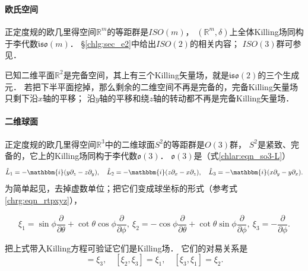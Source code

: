 \paragraph{欧氏空间}
正定度规的欧几里得空间$\mathbb{R}^m$的等距群是$ISO(m)$，
$(\mathbb{R}^m,\delta)$上全体Killing场同构于李代数$\mathfrak{iso}(m)$．
\S\ref{chlg:sec_e2}中给出$ISO(2)$的相关内容；
$ISO(3)$群可参见\parencite[\S 9.6]{tung-1985}．


\begin{example}\label{chlg:exm_incomplete-iso2}
    已知二维平面$\mathbb{R}^2$是完备空间，其上有三个Killing矢量场，就是$\mathfrak{iso}(2)$的三个生成元．
    若把下半平面挖掉，那么剩余的二维空间不再是完备的，完备Killing矢量场只剩下沿$x$轴的平移；
    沿$y$轴的平移和绕$z$轴的转动都不再是完备Killing矢量场．
\end{example}

\paragraph{二维球面}\label{chlg:sec_S2}
正定度规的欧几里得空间$\mathbb{R}^3$中的二维球面$S^2$的等距群是$O(3)$群，
$S^2$是紧致、完备的，它上的Killing场同构于李代数$\mathfrak{o}(3)$．
$\mathfrak{o}(3)$是（式\eqref{chlar:eqn_so3-L}）
\begin{equation*}
        \hat{L}_1 = -\mathbbm{i} (y \partial_z - z \partial_y ), \quad
        \hat{L}_2 = -\mathbbm{i} (z \partial_x - x \partial_z ), \quad
        \hat{L}_3 = -\mathbbm{i} (x \partial_y - y \partial_x ).
\end{equation*}
为简单起见，去掉虚数单位；把它们变成球坐标的形式（参考式\eqref{chrg:eqn_rtpxyz}），
\begin{small}
\begin{equation}\label{chlg:eqn_S2-killing}
    \xi_1= \sin\phi \frac{\partial }{\partial \theta} + \cot\theta \cos\phi \frac{\partial }{\partial \phi},\
    \xi_2=-\cos\phi\frac{\partial }{\partial \theta}+\cot\theta\sin\phi \frac{\partial }{\partial \phi},\
    \xi_3=-\frac{\partial }{\partial \phi} .
\end{equation}
\end{small}
把上式带入Killing方程可验证它们是Killing场．
它们的对易关系是
\begin{equation}
    [\xi_1, \xi_2] = \xi_3, \quad
    [\xi_2, \xi_3] = \xi_1, \quad
    [\xi_3, \xi_1] = \xi_2 .
\end{equation}





